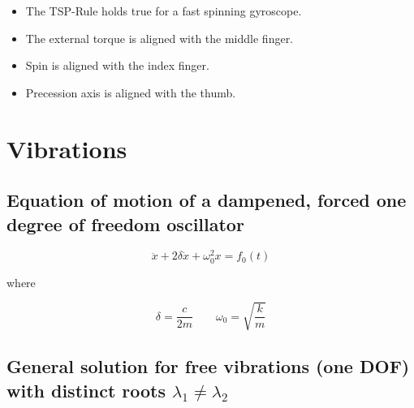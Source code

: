 \documentclass[10pt,a4paper]{scrartcl}
\begin{document}
\begin{multicols*}{2}

\begin{itemize}
\item The TSP-Rule holds true for a fast spinning gyroscope.
\item The external torque is aligned with the middle finger.
\item Spin is aligned with the index finger.
\item Precession axis is aligned with the thumb.
\end{itemize}

\section{Vibrations}

\subsection{Equation of motion of a dampened, forced one degree of freedom oscillator}

\begin{equation*}
\ddot{x}+2\delta\dot{x}+\omega_0^2x=f_0(t)
\end{equation*}

where

\begin{equation*}
\delta=\frac{c}{2m}\qquad \omega_0=\sqrt{\frac{k}{m}}
\end{equation*}


\subsection{General solution for free vibrations (one DOF) with distinct roots $\lambda_1\neq\lambda_2$}


\end{multicols*}
\end{document}
